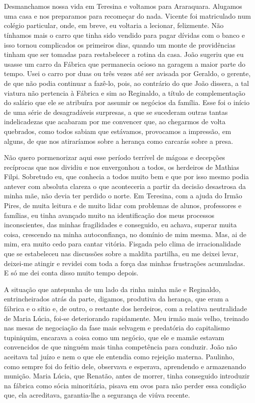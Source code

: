 \chapter{}
Desmanchamos nossa vida em Teresina e voltamos para Araraquara.
Alugamos uma casa e nos preparamos para recomeçar do nada.
Vicente foi matriculado num colégio particular, onde, em breve, eu voltaria a lecionar, felizmente.
Não tínhamos mais o carro que tinha sido vendido para pagar dívidas com o banco e isso tornou complicados os primeiros dias, quando um monte de providências tinham que ser tomadas para restabelecer a rotina da casa.
João sugeriu que eu usasse um carro da Fábrica que permanecia ocioso na garagem a maior parte do tempo.
Usei o carro por duas ou três vezes até ser avisada por Geraldo, o gerente, de que não podia continuar a fazê-lo, pois, ao contrário do que João dissera, a tal viatura não pertencia à Fábrica e sim ao Reginaldo, a título de complementação do salário que ele se atribuíra por assumir os negócios da família.
Esse foi o início de uma série de desagradáveis surpresas, a que se sucederam outras tantas indelicadezas que acabaram por me convencer que, ao chegarmos de volta quebrados, como todos sabiam que estávamos, provocamos a impressão, em alguns, de que nos atiraríamos sobre a herança como carcarás sobre a presa.

Não quero pormenorizar aqui esse período terrível de mágoas e decepções recíprocas que nos dividiu e nos envergonhou a todos, os herdeiros de Mathias Filpi.
Sobretudo eu, que conhecia a todos muito bem e que  por isso mesmo podia antever com absoluta clareza o que aconteceria a partir da decisão desastrosa da minha mãe, não devia ter perdido o norte.
Em Teresina, com a ajuda do Irmão Pires, de muita leitura e de muito lidar com problemas de alunos, professores e famílias, eu tinha avançado muito na identificação dos meus processos inconscientes, das minhas fragilidades e conseguido, eu achava, superar muita coisa, crescendo na minha autoconfiança, no domínio de mim mesma.
Mas, ai de mim, era muito cedo para cantar vitória.
Fisgada pelo clima de irracionalidade que se estabeleceu nas discussões sobre a maldita partilha, eu me deixei levar, deixei-me atingir e revidei com toda a força das minhas frustrações acumuladas.
E só me dei conta disso muito tempo depois.

A situação que antepunha de um lado da rinha minha mãe e Reginaldo, entrincheirados atrás da parte, digamos, produtiva da herança, que eram a fábrica e o sítio e, de outro, o restante dos herdeiros, com a relativa neutralidade de Maria Lúcia, foi-se deteriorando rapidamente.
Meu irmão mais velho, treinado nas mesas de negociação da fase mais selvagem e predatória do capitalismo tupiniquim, encarava a coisa como um negócio, que ele e mamãe estavam convencidos de que ninguém mais tinha competência para conduzir.
João não aceitava tal juízo e nem o que ele entendia como rejeição materna.
Paulinho, como sempre foi do feitio dele, observava e esperava, aprendendo e armazenando munição.
Maria Lúcia, que Renatão, antes de morrer, tinha conseguido introduzir na fábrica como sócia minoritária, pisava em ovos para não perder essa condição que, ela acreditava, garantia-lhe a segurança de viúva recente.

